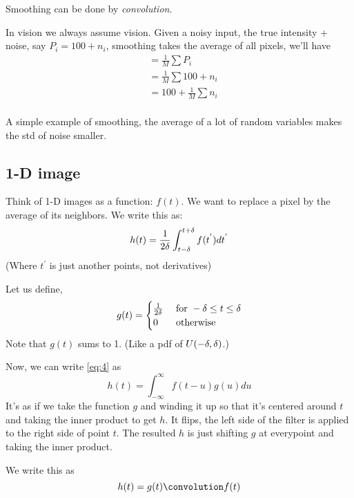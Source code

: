 Smoothing can be done by \emph{convolution}.

In vision we always assume vision. Given a noisy input, the true intensity
+ noise, say $P_i = 100 + n_i$, smoothing takes the average of all pixels, we'll have
\begin{align*}
 &= \frac{1}{M} \sum P_i\\
&=  \frac{1}{M} \sum 100 + n_i\\
&= 100 + \frac{1}{M} \sum n_i\\
\end{align*}

A simple example of smoothing, the average of a lot of random variables makes the std of noise
smaller. 

\subsection{1-D image}
\label{sec:1-d-image}
Think of 1-D images as a function: $f(t)$. We want to replace a pixel
by the average of its neighbors. We write this as:
\begin{equation}
  \label{eq:4}
  h(t) = \frac{1}{2\delta}\int_{t-\delta}^{t+\delta} f(t^{'}) dt^{'}
\end{equation}
(Where $t^{'}$ is just another points, not derivatives)

Let us define,
\begin{equation}
  \label{eq:6}
  g(t) =
  \begin{cases}
     \frac{1}{2\delta} & \text{ for } -\delta \le t \le \delta\\
     0 & \text{ otherwise }
  \end{cases}
\end{equation}
Note that $g(t)$ sums to 1. (Like a pdf of $U(-\delta, \delta)$.)

Now, we can write \eqref{eq:4} as
\begin{equation}
  \label{eq:8}
  h(t) = \int_{-\infty}^\infty f(t-u)g(u)du
\end{equation}
It's as if we take the function $g$ and winding it up so that it's
centered around $t$ and taking the inner product to get $h$. It flips,
the left side of the filter is applied to the right side of point
$t$. The resulted $h$ is just shifting $g$ at everypoint and taking the
inner product.

We write this as
\begin{equation}
  \label{eq:11}
  h(t) = g(t)\conv f(t)
\end{equation}

